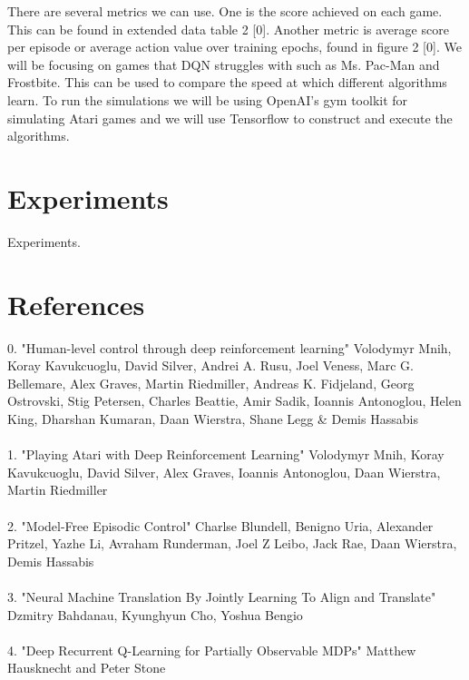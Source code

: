 \documentclass{article}
\begin{document}
	There are several metrics we can use. One is the score achieved on each game. This can be found in extended data table 2 [0]. Another metric is average score per episode or average action value over training epochs, found in figure 2 [0]. We will be focusing on games that DQN struggles with such as Ms. Pac-Man and Frostbite. This can be used to compare the speed at which different algorithms learn. To run the simulations we will be using OpenAI's gym toolkit for simulating Atari games and we will use Tensorflow to construct and execute the algorithms.

\section{Experiments}
Experiments.
 
\section*{References}
	0. "Human-level control through deep reinforcement learning" Volodymyr Mnih, Koray Kavukcuoglu, David Silver, Andrei A. Rusu, Joel Veness, Marc G. Bellemare, Alex Graves, Martin Riedmiller, Andreas K. Fidjeland, Georg Ostrovski, Stig Petersen, Charles Beattie, Amir Sadik, Ioannis Antonoglou, Helen King, Dharshan Kumaran, Daan Wierstra, Shane Legg \& Demis Hassabis \\
	\\
	1. "Playing Atari with Deep Reinforcement Learning" Volodymyr Mnih, Koray Kavukcuoglu, David Silver, Alex Graves, Ioannis Antonoglou, Daan Wierstra, Martin Riedmiller \\
	\\
	2. "Model-Free Episodic Control" Charlse Blundell, Benigno Uria, Alexander Pritzel, Yazhe Li, Avraham Runderman, Joel Z Leibo, Jack Rae, Daan Wierstra, Demis Hassabis \\
	\\
	3. "Neural Machine Translation By Jointly Learning To Align and Translate" Dzmitry Bahdanau, Kyunghyun Cho, Yoshua Bengio \\
	\\
	4. "Deep Recurrent Q-Learning for Partially Observable MDPs" Matthew Hausknecht and Peter Stone
\end{document}
